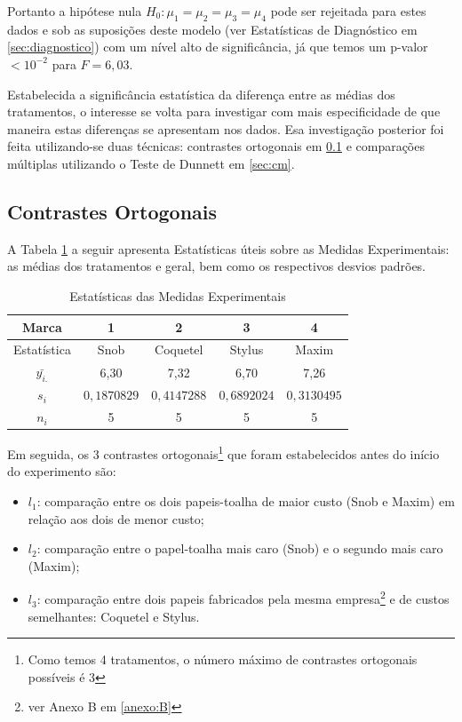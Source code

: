 \documentclass[a4paper,12pt,notitlepage]{article}
\begin{document}
    Portanto a hipótese nula $H_0: \mu_1 = \mu_2 = \mu_3 = \mu_4$ pode ser rejeitada para estes dados e sob as suposições deste modelo (ver Estatísticas de Diagnóstico em \ref{sec:diagnostico}) com um nível alto de significância, já que temos um p-valor $<10^{-2}$ para $F = 6,03$. 
    
    Estabelecida a significância estatística da diferença entre as médias dos tratamentos, o interesse se volta para investigar com mais especificidade de que maneira estas diferenças se apresentam nos dados. Esa investigação posterior foi feita utilizando-se duas técnicas: contrastes ortogonais em \ref{sec:co} e comparações múltiplas utilizando o Teste de Dunnett em \ref{sec:cm}.
    
\subsection{Contrastes Ortogonais}\label{sec:co}

A Tabela \ref{tabela:estatisticas} a seguir apresenta Estatísticas úteis sobre as Medidas Experimentais: as médias dos tratamentos e geral, bem como os respectivos desvios padrões.

\begin{table}[htb]\label{tabela:estatisticas}
    \centering
    \begin{tabular}{c||c|c|c|c}
        Marca & 1 & 2 & 3 & 4   \\\hline
        Estatística & Snob & Coquetel & Stylus & Maxim \\\hline
        $\bar{y_{i.}}$&6,30&7,32&6,70&7,26\\
        $s_i$&$0,1870829$&$0,4147288$&$0,6892024$&$0,3130495$\\
        $n_i$&5&5&5&5\\
    \end{tabular}\caption{Estatísticas das Medidas Experimentais}
\end{table}

Em seguida, os 3 contrastes ortogonais\footnote{Como temos 4 tratamentos, o número máximo de contrastes ortogonais possíveis é 3} que foram estabelecidos antes do início do experimento são:

\begin{itemize}
    \item $l_1$: comparação entre os dois papeis-toalha de maior custo (Snob e Maxim) em relação aos dois de menor custo;
    \item $l_2$: comparação entre o papel-toalha mais caro (Snob) e o segundo mais caro (Maxim);
    \item $l_3$: comparação entre dois papeis fabricados pela mesma empresa\footnote{ver Anexo B em \ref{anexo:B}} e de custos semelhantes: Coquetel e Stylus.
\end{itemize}
\end{document}

